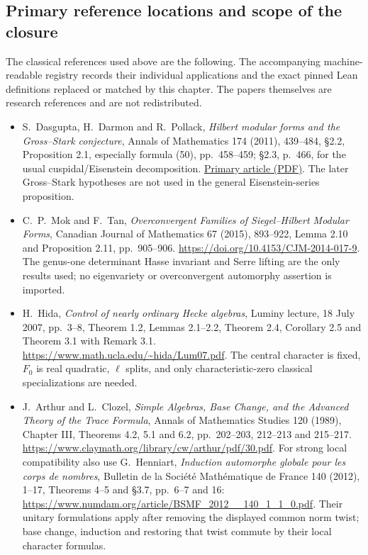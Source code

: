 \subsection{Primary reference locations and scope of the closure}

The classical references used above are the following.  The accompanying
machine-readable registry records their individual applications and
the exact pinned Lean definitions replaced or matched by this chapter.
The papers themselves are research references and are not redistributed.

\begin{itemize}
\item S.~Dasgupta, H.~Darmon and R.~Pollack,
\emph{Hilbert modular forms and the Gross--Stark conjecture},
Annals of Mathematics 174 (2011), 439--484,
\S2.2, Proposition 2.1, especially formula (50), pp.~458--459;
\S2.3, p.~466, for the usual cuspidal/Eisenstein decomposition.
\href{https://annals.math.princeton.edu/wp-content/uploads/annals-v174-n1-p12-p.pdf}{Primary article (PDF)}.
The later Gross--Stark hypotheses are not used in the general
Eisenstein-series proposition.

\item C.~P.~Mok and F.~Tan,
\emph{Overconvergent Families of Siegel--Hilbert Modular Forms},
Canadian Journal of Mathematics 67 (2015), 893--922,
Lemma 2.10 and Proposition 2.11, pp.~905--906.
\url{https://doi.org/10.4153/CJM-2014-017-9}.
The genus-one determinant Hasse invariant and Serre lifting are
the only results used; no eigenvariety or overconvergent
automorphy assertion is imported.

\item H.~Hida, \emph{Control of nearly ordinary Hecke algebras},
Luminy lecture, 18 July 2007, pp.~3--8,
Theorem 1.2, Lemmas 2.1--2.2, Theorem 2.4,
Corollary 2.5 and Theorem 3.1 with Remark 3.1.
\url{https://www.math.ucla.edu/~hida/Lum07.pdf}.
The central character is fixed, $F_0$ is real quadratic,
$\ell$ splits, and only characteristic-zero classical
specializations are needed.

\item J.~Arthur and L.~Clozel,
\emph{Simple Algebras, Base Change, and the Advanced Theory
of the Trace Formula}, Annals of Mathematics Studies 120 (1989),
Chapter III, Theorems 4.2, 5.1 and 6.2,
pp.~202--203, 212--213 and 215--217.
\url{https://www.claymath.org/library/cw/arthur/pdf/30.pdf}.
For strong local compatibility also use G.~Henniart,
\emph{Induction automorphe globale pour les corps de nombres},
Bulletin de la Soci\'et\'e Math\'ematique de France 140 (2012),
1--17, Theorems 4--5 and \S3.7, pp.~6--7 and 16:
\url{https://www.numdam.org/article/BSMF_2012__140_1_1_0.pdf}.
Their unitary formulations apply after removing the displayed
common norm twist; base change, induction and restoring that
twist commute by their local character formulas.


\end{itemize}

